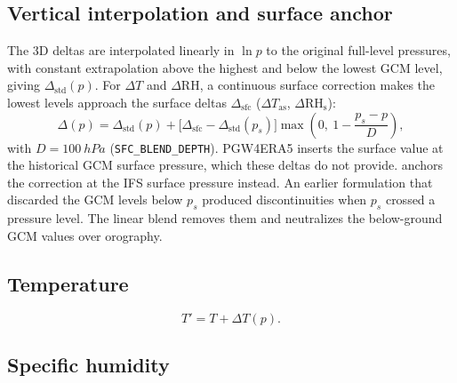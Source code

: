 \documentclass[11pt,a4paper]{article}
\newcommand{\code}[1]{\texttt{#1}}
\newcommand{\dT}{\Delta T}
\newcommand{\dRH}{\Delta \mathrm{RH}}
\begin{document}
\subsection{Vertical interpolation and surface anchor}

The 3D deltas are interpolated linearly in $\ln p$ to the original full-level
pressures, with constant extrapolation above the highest and below the lowest
GCM level, giving $\Delta_{\mathrm{std}}(p)$. For $\dT$ and $\dRH$, a
continuous surface correction makes the lowest levels approach the surface
deltas $\Delta_{\mathrm{sfc}}$ ($\Delta T_{\mathrm{as}}$, $\Delta\mathrm{RH_s}$):
\begin{equation}
  \Delta(p) = \Delta_{\mathrm{std}}(p) + \bigl[\Delta_{\mathrm{sfc}} - \Delta_{\mathrm{std}}(p_s)\bigr]
  \max\!\left(0,\ 1 - \frac{p_s - p}{D}\right),
  \label{eq:anchor}
\end{equation}
with $D = \SI{100}{hPa}$ (\code{SFC\_BLEND\_DEPTH}). PGW4ERA5 inserts the
surface value at the historical GCM surface pressure, which these deltas do
not provide.  anchors the correction at the IFS surface
pressure instead. An earlier formulation that discarded the GCM levels below
$p_s$ produced discontinuities when $p_s$ crossed a pressure level. The
linear blend removes them and neutralizes the below-ground GCM values over
orography.

\subsection{Temperature}

\begin{equation}
  T' = T + \dT(p).
\end{equation}

\subsection{Specific humidity}
\end{document}
